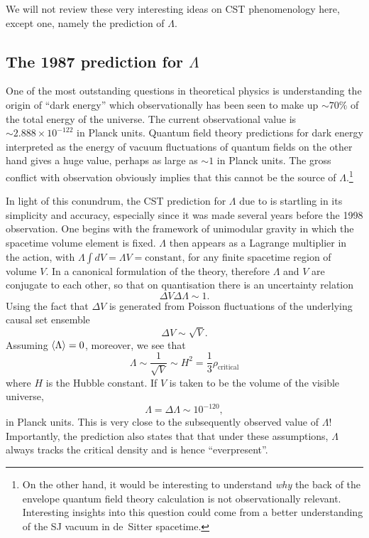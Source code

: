 We will not review these very interesting ideas on CST phenomenology here, except one, namely the prediction of
$\Lambda$.

\subsection{The 1987 prediction for $\Lambda$} 
\label{ssec:lambda}

One of the most outstanding questions in theoretical physics is understanding the origin of ``dark energy''  which
observationally has been seen to make up $\sim 70\%$ of the total energy of the universe. The current observational value
is  $\sim 2.888 \times 10^{-122}$ in Planck units. Quantum field theory predictions for dark energy interpreted as the
energy of vacuum fluctuations of quantum fields on the other hand gives a huge value, perhaps as large as  $\sim 1$ in Planck units.  The gross
conflict with observation obviously implies that this cannot be the source of $\Lambda$.\footnote{On the other hand, it
  would be interesting to understand \emph{why} the back of the envelope quantum field theory calculation is not
  observationally relevant. Interesting insights into this question could come
  from a better understanding of the SJ vacuum in de~Sitter spacetime.}


In light of this conundrum, the CST prediction  for $\Lambda$  due to \cite{lambdaone} is startling in its simplicity and
accuracy, especially since it was made several years before the  {1998} observation.
One begins with the framework of unimodular gravity \citep{lambdatwo,unruhwald} in which the spacetime
volume element is fixed. 
$\Lambda$ then appears as a Lagrange multiplier in the action, with $\Lambda \int dV= \Lambda V ={\mathrm{constant}}$, for any finite spacetime region of volume $V$. In a canonical formulation of the
theory, therefore $\Lambda$ and $V$ are conjugate to each other, so that on quantisation there is an uncertainty relation 
\begin{equation}
\Delta V \Delta \Lambda \sim 1.
  \end{equation} 
Using the fact that $\Delta V $ is generated from Poisson fluctuations of the underlying causal set ensemble 
\begin{equation} 
  \Delta V \sim \sqrt{V}. 
\end{equation}
{ Assuming}  $\langle {\Lambda} \rangle=0$, moreover, we see that 
\begin{equation}
  \Lambda \sim \frac{1}{\sqrt{V}}\sim H^2 =\frac{1}{3}\rho_{\mathrm{critical}}
\end{equation}
where $H$ is the Hubble constant. If  $V$ is taken to be the  volume  of the visible universe, 
\begin{equation}
  \Lambda=\Delta \Lambda \sim 10^{-120}, 
\end{equation}
in Planck units. This is very close to the subsequently observed value of $\Lambda$! Importantly, the prediction also states that
that under these assumptions, $\Lambda$ always tracks the critical density and is hence ``everpresent''. 

